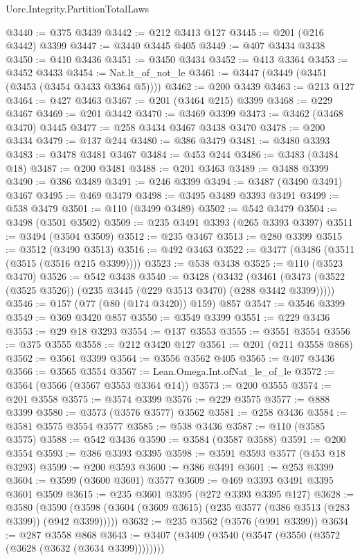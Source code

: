 \begin{lexlean}{Uorc.Integrity.PartitionTotalLaws}
\begin{coremodule}
@3440 := @375 @3439
@3442 := @212 @3413 @127
@3445 := @201 (@216 @3442) @3399
@3447 := @3440 @3445 @405
@3449 := @407 @3434 @3438
@3450 := @410 @3436
@3451 := @3450 @3434
@3452 := @413 @3364
@3453 := @3452 @3433
@3454 := Nat.lt_of_not_le
@3461 := @3447 (@3449 (@3451 (@3453 (@3454 @3433 @3364 @5))))
@3462 := @200 @3439
@3463 := @213 @127
@3464 := @427 @3463
@3467 := @201 (@3464 @215) @3399
@3468 := @229 @3467
@3469 := @201 @3442
@3470 := @3469 @3399
@3473 := @3462 (@3468 @3470) @3445
@3477 := @258 @3434 @3467 @3438 @3470
@3478 := @200 @3434
@3479 := @137 @244
@3480 := @386 @3479
@3481 := @3480 @3393
@3483 := @3478 @3481 @3467
@3484 := @453 @244
@3486 := @3483 (@3484 @18)
@3487 := @200 @3481
@3488 := @201 @3463
@3489 := @3488 @3399
@3490 := @386 @3489
@3491 := @246 @3399
@3494 := @3487 (@3490 @3491) @3467
@3495 := @469 @3479
@3498 := @3495 @3489 @3393 @3491
@3499 := @538 @3479
@3501 := @110 (@3499 @3489)
@3502 := @542 @3479
@3504 := @3498 (@3501 @3502)
@3509 := @235 @3491 @3393 (@265 @3393 @3397)
@3511 := @3494 (@3504 @3509)
@3512 := @235 @3467
@3513 := @280 @3399
@3515 := @3512 (@3490 @3513)
@3516 := @492 @3463
@3522 := @3477 (@3486 (@3511 (@3515 (@3516 @215 @3399))))
@3523 := @538 @3438
@3525 := @110 (@3523 @3470)
@3526 := @542 @3438
@3540 := @3428
    (@3432 (@3461 (@3473 (@3522 (@3525 @3526)) (@235 @3445 (@229 @3513 @3470) (@288 @3442 @3399)))))
@3546 := @157 (@77 (@80 (@174 @3420)) @159) @857
@3547 := @3546 @3399
@3549 := @369 @3420 @857
@3550 := @3549 @3399
@3551 := @229 @3436
@3553 := @29 @18 @3293
@3554 := @137 @3553
@3555 := @3551 @3554
@3556 := @375 @3555
@3558 := @212 @3420 @127
@3561 := @201 (@211 @3558 @868)
@3562 := @3561 @3399
@3564 := @3556 @3562 @405
@3565 := @407 @3436
@3566 := @3565 @3554
@3567 := Lean.Omega.Int.ofNat_le_of_le
@3572 := @3564 (@3566 (@3567 @3553 @3364 @14))
@3573 := @200 @3555
@3574 := @201 @3558
@3575 := @3574 @3399
@3576 := @229 @3575
@3577 := @888 @3399
@3580 := @3573 (@3576 @3577) @3562
@3581 := @258 @3436
@3584 := @3581 @3575 @3554 @3577
@3585 := @538 @3436
@3587 := @110 (@3585 @3575)
@3588 := @542 @3436
@3590 := @3584 (@3587 @3588)
@3591 := @200 @3554
@3593 := @386 @3393 @3395
@3598 := @3591 @3593 @3577 (@453 @18 @3293)
@3599 := @200 @3593
@3600 := @386 @3491
@3601 := @253 @3399
@3604 := @3599 (@3600 @3601) @3577
@3609 := @469 @3393 @3491 @3395 @3601 @3509
@3615 := @235 @3601 @3395 (@272 @3393 @3395 @127)
@3628 := @3580
    (@3590 (@3598 (@3604 (@3609 @3615) (@235 @3577 (@386 @3513 (@283 @3399)) (@942 @3399)))))
@3632 := @235 @3562 (@3576 (@991 @3399))
@3634 := @287 @3558 @868
@3643 := @3407 (@3409 (@3540 (@3547 (@3550 (@3572 (@3628 (@3632 (@3634 @3399))))))))

\end{coremodule}
\end{lexlean}

